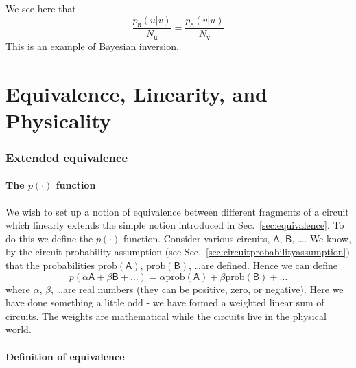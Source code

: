 \documentclass[10pt]{article}
\begin{document}
We see here that
\begin{equation}\label{bayesinversion}
\frac{p_\mathtt{M}(u|v) }{N_\mathtt{u}} =  \frac{p_\mathtt{M}(v|u) }{N_\mathtt{v}}
\end{equation}
This is an example of Bayesian inversion.









\part{Equivalence, Linearity, and Physicality}\label{part:equivalencelinearityandphysicality}






\section{Extended equivalence}\label{sec:extendedequivalence}

\subsection{The $p(\cdot)$ function}

We wish to set up a notion of equivalence between different fragments of a circuit which linearly extends the simple notion introduced in Sec.\ \ref{sec:equivalence}.  To do this we define the $p(\cdot)$ function.  Consider various circuits, $\mathsf A$, $\mathsf B$, \dots. We know, by the circuit probability assumption (see Sec.\ \ref{sec:circuitprobabilityassumption}) that the probabilities $\text{prob}(\mathsf{A})$, $\text{prob}(\mathsf{B})$, \dots are defined.  Hence we can define
\begin{equation}
p(\alpha \mathsf{A} + \beta\mathsf{B} + \dots ) = \alpha \text{prob}(\mathsf{A}) + \beta \text{prob}(\mathsf{B}) + \dots
\end{equation}
where $\alpha$, $\beta$, \dots are real numbers (they can be positive, zero, or negative).
Here we have done something a little odd - we have formed a weighted linear sum of circuits.  The weights are mathematical while the circuits live in the physical world.

\subsection{Definition of equivalence}
\end{document}
